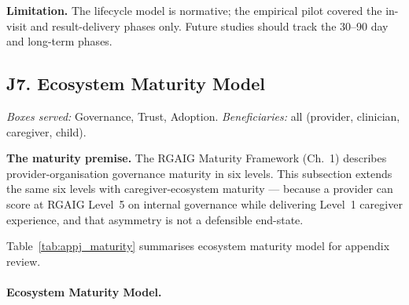 \noindent\textbf{Limitation.} The lifecycle model is normative; the empirical pilot covered the in-visit and result-delivery phases only. Future studies should track the 30--90 day and long-term phases.

\subsection*{J7. Ecosystem Maturity Model}
\label{sec:appj_maturity}

\noindent\emph{Boxes served:} Governance, Trust, Adoption. \emph{Beneficiaries:} all (provider, clinician, caregiver, child).

\noindent\textbf{The maturity premise.} The RGAIG Maturity Framework (Ch.~1) describes provider-organisation governance maturity in six levels. This subsection extends the same six levels with caregiver-ecosystem maturity --- because a provider can score at RGAIG Level~5 on internal governance while delivering Level~1 caregiver experience, and that asymmetry is not a defensible end-state.

\noindent Table~\ref{tab:appj_maturity} summarises ecosystem maturity model for appendix review.

\paragraph{Ecosystem Maturity Model.}




